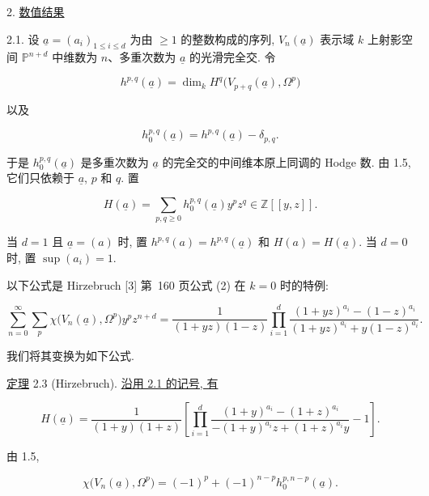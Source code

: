 2. \underline{数值结果}

2.1. 设 $\underline a=(a_i)_{1\leq i\leq d}$ 为由 $\geq1$ 的整数构成的序列, $V_n(\underline a)$ 表示域 $k$ 上射影空间 $\mathbb P^{n+d}$ 中维数为 $n$、多重次数为 $\underline a$ 的光滑完全交. 令

\begin{equation*}
h^{p,q}(\underline a)
=\dim_k H^q\bigl(V_{p+q}(\underline a),\Omega^p\bigr)
\end{equation*}

以及

\begin{equation*}
h_0^{p,q}(\underline a)=h^{p,q}(\underline a)-\delta_{p,q}.
\end{equation*}

于是 $h_0^{p,q}(\underline a)$ 是多重次数为 $\underline a$ 的完全交的中间维本原上同调的 Hodge 数. 由 1.5, 它们只依赖于 $\underline a$, $p$ 和 $q$. 置

\begin{equation}\tag{2.1.1}
H(\underline a)=\sum_{p,q\geq0}h_0^{p,q}(\underline a)y^pz^q
\in\mathbb Z[[y,z]].
\end{equation}

当 $d=1$ 且 $\underline a=(a)$ 时, 置 $h^{p,q}(a)=h^{p,q}(\underline a)$ 和 $H(a)=H(\underline a)$. 当 $d=0$ 时, 置 $\sup(a_i)=1$.

以下公式是 Hirzebruch [3] 第~160 页公式 (2) 在 $k=0$ 时的特例:


\begin{equation}\tag{2.2}
\sum_{n=0}^{\infty}\sum_p
\chi\bigl(V_n(\underline a),\Omega^p\bigr)y^pz^{n+d}
=\frac{1}{(1+yz)(1-z)}
\prod_{i=1}^d
\frac{(1+yz)^{a_i}-(1-z)^{a_i}}
{(1+yz)^{a_i}+y(1-z)^{a_i}}.
\end{equation}

我们将其变换为如下公式.

\underline{定理} 2.3 (Hirzebruch). \underline{沿用 2.1 的记号, 有}

\begin{equation*}
H(\underline a)=\frac{1}{(1+y)(1+z)}\left[
\prod_{i=1}^d
\frac{(1+y)^{a_i}-(1+z)^{a_i}}
{-(1+y)^{a_i}z+(1+z)^{a_i}y}-1\right].
\end{equation*}

由 1.5,

\begin{equation*}
\chi\bigl(V_n(\underline a),\Omega^p\bigr)
=(-1)^p+(-1)^{n-p}h_0^{p,n-p}(\underline a).
\end{equation*}

